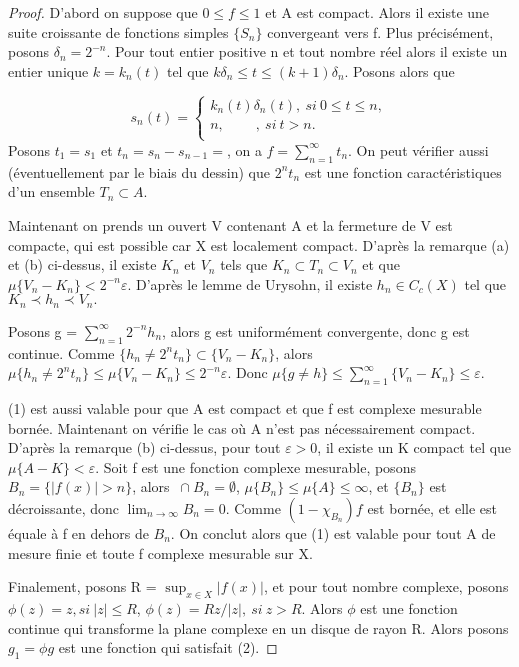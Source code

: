 \documentclass{article}
\begin{document}
\begin{proof}
    D'abord on suppose que $0 \leq f \leq 1$ et A est compact. Alors il existe une suite croissante de fonctions simples $\{S_{n}\}$ convergeant vers f. Plus précisément, posons $\delta_{n} = 2^{-n}$. Pour tout entier positive n et tout nombre réel alors il existe un entier unique $k = k_{n}(t)$ tel que $ k\delta_{n} \leq t \leq (k+1)\delta_{n}$. Posons alors que 

    \[s_{n}(t) = \begin{cases}
      k_{n}(t)\delta_{n}(t), \ si\ 0\leq t \leq n, \\  
      n, \ \ \ \ \ \ \ \  \ \ ,\  si\ t > n. \\  
    \end{cases}
    \] 
    Posons $t_{1}= s_{1}$ et $t_{n} = s_{n} - s_{n-1} = $, on a $ f = \sum _{n=1}^{\infty} t_{n} $. On peut vérifier aussi (éventuellement par le biais du dessin) que $2^{n}t_{n}$ est une fonction caractéristiques d'un ensemble $T_{n} \subset A$. \par
    Maintenant on prends un ouvert V contenant A et la fermeture de V est compacte, qui est possible car X est localement compact.
     D'après la remarque (a) et (b) ci-dessus, il existe $K_{n}$ et $V_{n}$ tels que $K_{n} \subset T_{n} \subset V_{n}$ et que $\mu \{V_{n} - K_{n}\} < 2^{-n}\varepsilon$. D'après le lemme de Urysohn, il existe $h_{n} \in C_{c}(X)$ tel que $K_{n} \prec h_{n} \prec V_{n}.$ \par
    Posons g = $\sum_{n=1}^{\infty}2^{-n}h_{n}$, alors g est uniformément convergente, donc g est continue. Comme $\{h_{n} \neq 2^{n}t_{n}\} \subset \{V_{n} - K_{n}\}$, alors $\mu\{h_{n} \neq 2^{n}t_{n}\} \leq \mu\{V_{n} - K_{n}\} \leq 2^{-n}\varepsilon.$ Donc $\mu \{g \neq h\} \leq \sum_{n=1}^{\infty}\{V_{n} - K_{n}\} \leq \varepsilon.$ \par
    (1) est aussi valable pour que A est compact et que f est complexe mesurable bornée. Maintenant on vérifie le cas où A n'est pas nécessairement compact. D'après la remarque (b) ci-dessus, pour tout $\varepsilon >0$, il existe un K compact tel que $\mu \{A - K\} < \varepsilon$. Soit f est une fonction complexe mesurable, posons $B_{n} = \{ |f(x)|> n \}$,  alors $\  \cap B_{n} = \emptyset$, $\mu\{B_{n}\} \leq \mu \{A\} \leq \infty$, et $\{B_{n}\}$ est décroissante, donc $\lim_{n \rightarrow \infty} B_{n} = 0$. Comme $(1- \chi_{B_{n}} )f$ est bornée, et elle est équale à f en dehors de $B_{n}$. On conclut alors que (1) est valable pour tout A de mesure finie et toute f complexe mesurable sur X. \par
    Finalement, posons R = $\sup_{x\in X} |f(x)|$, et pour tout nombre complexe, posons $\phi(z) = z, si \ |z| \leq R$, $\phi(z) = Rz/|z|, \ si\ z > R.$ Alors $\phi$ est une fonction continue qui transforme la plane complexe en un disque de rayon R. Alors posons $g_{1}= \phi g$ est une fonction qui satisfait (2).
\end{proof}
\end{document}
